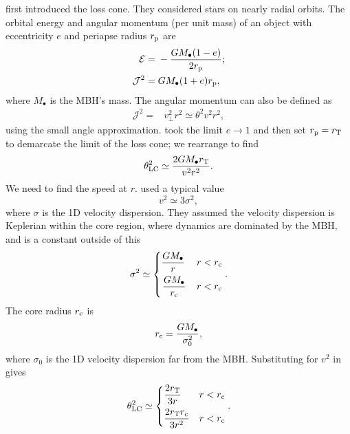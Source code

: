 \citet{Frank1976} first introduced the loss cone. They considered stars on nearly radial orbits. The orbital energy and angular momentum (per unit mass) of an object with eccentricity $e$ and periapse radius $r_\mathrm{p}$ are
\begin{align}
\mathcal{E} = {} & -\dfrac{GM_\bullet(1 - e)}{2r_\mathrm{p}}; \\
\mathcal{J}^2 = {} & GM_\bullet(1 + e)r_\mathrm{p},
\end{align}
where $M_\bullet$ is the MBH's mass. The angular momentum can also be defined as
\begin{align}
\mathcal{J}^2 = {} & v_\perp^2r^2 \simeq \theta^2v^2r^2,
\end{align}
using the small angle approximation. \citet{Frank1976} took the limit $e \rightarrow 1$ and then set $r_\mathrm{p} = r_\mathrm{T}$ to demarcate the limit of the loss cone; we rearrange to find
\begin{equation}
\theta_\mathrm{LC}^2 \simeq \dfrac{2GM_\bullet r_\mathrm{T}}{v^2r^2}.
\label{eq:LC-FR}
\end{equation}
We need to find the speed at $r$. \citet{Frank1976} used a typical value
\begin{equation}
v^2 \simeq 3\sigma^2,
\end{equation}
where $\sigma$ is the 1D velocity dispersion. They assumed the velocity dispersion is Keplerian within the core region, where dynamics are dominated by the MBH, and is a constant outside of this
\begin{equation}
\sigma^2 \simeq \begin{cases}
\displaystyle \dfrac{GM_\bullet}{r} & r < r\sub{c} \vspace{0.4\normalbaselineskip} \\
\displaystyle \left. \dfrac{GM_\bullet}{r\sub{c}} \right. & r < r\sub{c}
\end{cases}.
\end{equation}
The core radius $r_\mathrm{c}$ is
\begin{equation}
r_\mathrm{c} = \dfrac{GM_\bullet}{\sigma_0^2},
\end{equation}
where $\sigma_0$ is the 1D velocity dispersion far from the MBH. Substituting for $v^2$ in  gives
\begin{align}
\theta\sub{LC}^2 \simeq \begin{cases}
\displaystyle \dfrac{2r\sub{T}}{3r} & r < r\sub{c} \vspace{0.4\normalbaselineskip} \\
\displaystyle \dfrac{2r\sub{T}r\sub{c}}{3r^2} & r < r\sub{c}
\end{cases}.
\label{eq:FR-LC}
\end{align}
